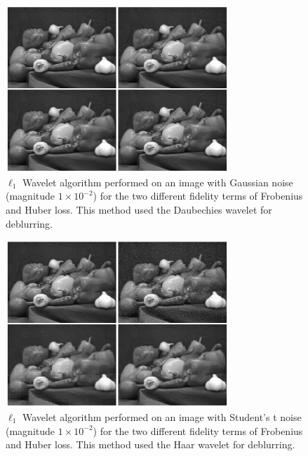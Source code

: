 \documentclass[10pt,a4paper]{article}
\begin{document}
\begin{figure}[H]
\begin{center}
\includegraphics[width = 0.75\textwidth]{../figures/waveletGaussD.pdf} 
\end{center}
\caption{$\ell_1$ Wavelet algorithm performed on an image with Gaussian noise (magnitude $1 \times 10^{-2}$) for the two different fidelity terms of Frobenius and Huber loss. This method used the Daubechies wavelet for deblurring.}
\label{waveletD_gauss}
\end{figure}

\begin{figure}[H]
\begin{center}
\includegraphics[width = 0.75\textwidth]{../figures/waveletStudentH.pdf} 
\end{center}
\caption{$\ell_1$ Wavelet algorithm performed on an image with Student's t noise (magnitude $1 \times 10^{-2}$) for the two different fidelity terms of Frobenius and Huber loss. This method used the Haar wavelet for deblurring.}
\label{waveletH_student}
\end{figure}
\end{document}
